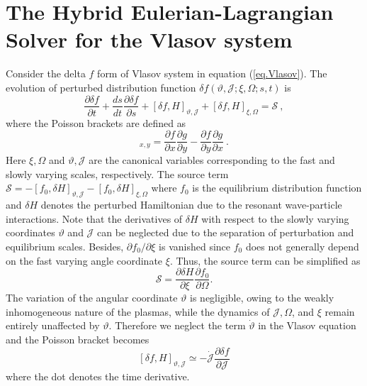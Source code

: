 \section{The Hybrid Eulerian-Lagrangian Solver for the Vlasov system}
\label{sec:vlasov}
Consider the  delta $f$ form of Vlasov system in equation (\ref{eq.Vlasov}). The evolution of  perturbed distribution function $\delta f(\vartheta,\mathcal{J};\xi,\Omega;s,t)$ is
\begin{equation}\label{eq.deltaf}
    \frac{\partial \delta f}{\partial t}+ \frac{d s}{d t} \frac{\partial \delta f}{\partial s} + \left[\delta f, H\right]_{\vartheta,\mathcal{J}} +  \left[\delta f, H\right]_{\xi,\Omega} = \mathcal{S}~,
\end{equation}
where the   Poisson brackets are defined as
\begin{equation}
    [f,~g]_{x,y} = \frac{\partial f}{\partial x}\frac{\partial g}{\partial y}-\frac{\partial f}{\partial y}\frac{\partial g}{\partial x}~.
\end{equation}
Here $\xi,\Omega$ and $\vartheta,\mathcal{J}$ are the canonical variables corresponding to the fast  and slowly varying scales, respectively.
The source term $\mathcal{S}= -\left[f_0, \delta H\right]_{\vartheta, \mathcal{J}} - \left[f_0, \delta H\right]_{\xi, \Omega}$ 
where $f_0$ is the equilibrium distribution function and $\delta H$ denotes the perturbed Hamiltonian due to the resonant wave-particle interactions.
Note that the derivatives of $\delta H$ with respect to the slowly varying coordinates $\vartheta$ and $\mathcal{J}$ can be neglected due to the separation of perturbation and equilibrium scales. Besides, $\partial f_0/\partial \xi$ is vanished since $f_0$ does not generally depend on the fast varying angle coordinate $\xi$.
Thus, the source term can be simplified as 
\begin{equation}
     \mathcal{S} = \frac{\partial \delta H}{\partial \xi}\frac{\partial f_0}{\partial \Omega}.
\end{equation}
The variation of the angular coordinate $\vartheta$ is negligible, owing to the weakly inhomogeneous nature of the plasmas, while the dynamics of $\mathcal{J}, \Omega$, and $\xi$ remain entirely unaffected by $\vartheta$.
Therefore we neglect the term $ \dot{\vartheta} $ in the Vlasov equation and the  Poisson bracket becomes
\begin{equation}
\left[\delta f, H\right]_{\vartheta,\mathcal{J}}\simeq 
 -\dot{\mathcal{J}} \frac{\partial \delta f}{\partial \mathcal{J}}      
\end{equation}
where the dot denotes the time derivative.

